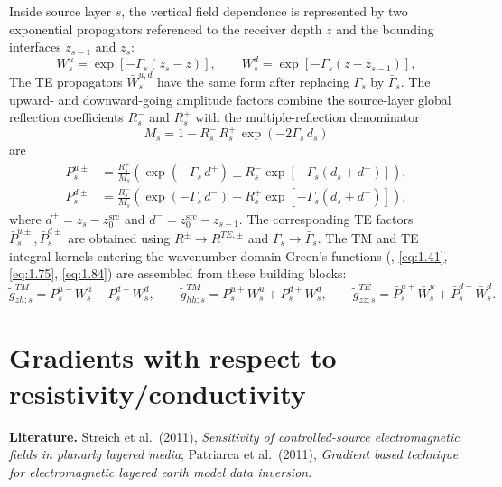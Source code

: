 \documentclass[12pt]{report}
\begin{document}
Inside source layer \(s\), the vertical field dependence is represented
by two exponential propagators referenced to the receiver depth \(z\) and
the bounding interfaces \(z_{s-1}\) and \(z_s\):
\begin{equation}
    W_s^u = \exp\!\left[-\Gamma_s(z_s - z)\right], \qquad
    W_s^d = \exp\!\left[-\Gamma_s(z - z_{s-1})\right],
    \label{eq:ch3-propagators}
\end{equation}
The TE propagators \(\bar W_s^{u,d}\) have the same form after replacing
\(\Gamma_s\) by \(\bar\Gamma_s\). The upward- and downward-going amplitude
factors combine the source-layer global reflection coefficients
\(R_s^-\) and \(R_s^+\) with the multiple-reflection denominator
\begin{equation}
    M_s = 1 - R_s^-\,R_s^+\,\exp(-2\Gamma_s\,d_s)
    \label{eq:ch3-Ms}
\end{equation}
are
\begin{align}
    P_s^{u\pm} &= \frac{R_s^+}{M_s}
        \left(\exp(-\Gamma_s\,d^+) \pm R_s^-\exp\!\left[-\Gamma_s(d_s+d^-)\right]\right),
    \label{eq:ch3-Pu}\\
    P_s^{d\pm} &= \frac{R_s^-}{M_s}
        \left(\exp(-\Gamma_s\,d^-) \pm R_s^+\exp\!\left[-\Gamma_s(d_s+d^+)\right]\right),
    \label{eq:ch3-Pd}
\end{align}
where \(d^+=z_s-z_0^{\mathrm{src}}\) and
\(d^-=z_0^{\mathrm{src}}-z_{s-1}\). The corresponding TE factors
\(\bar P_s^{u\pm},\bar P_s^{d\pm}\) are obtained using
\(R^\pm\to R^{TE,\pm}\) and \(\Gamma_s\to\bar\Gamma_s\). The TM and TE
integral kernels entering the wavenumber-domain Green's functions
(, \eqref{eq:1.41}, \eqref{eq:1.75}, \eqref{eq:1.84}) are
assembled from these building blocks:
\[
    \tilde g^{TM}_{zh;s} = P_s^{u-}W_s^u - P_s^{d-}W_s^d, \qquad
    \tilde g^{TM}_{hh;s} = P_s^{u+}W_s^u + P_s^{d+}W_s^d, \qquad
    \tilde g^{TE}_{zz;s} = \bar P_s^{u+}\bar W_s^u + \bar P_s^{d+}\bar W_s^d.
\]

\chapter{Gradients with respect to resistivity/conductivity}
\label{sec:res}

\textbf{Literature.} Streich et al.\ (2011), \emph{Sensitivity of
controlled-source electromagnetic fields in planarly layered media};
Patriarca et al.\ (2011), \emph{Gradient based technique for
electromagnetic layered earth model data inversion}.
\end{document}
